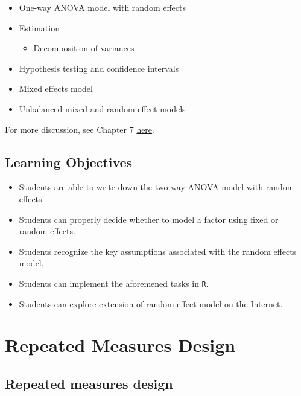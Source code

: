 \documentclass[12pt,]{book}
\providecommand{\tightlist}{%
  \setlength{\itemsep}{0pt}\setlength{\parskip}{0pt}}
\begin{document}
\begin{itemize}
\tightlist
\item
  One-way ANOVA model with random effects
\item
  Estimation

  \begin{itemize}
  \tightlist
  \item
    Decomposition of variances
  \end{itemize}
\item
  Hypothesis testing and confidence intervals
\item
  Mixed effects model
\item
  Unbalanced mixed and random effect models
\end{itemize}

For more discussion, see Chapter 7
\href{https://stat.ethz.ch/~meier/teaching/anova/random-and-mixed-effects-models.html}{here}.

\section{Learning Objectives}\label{learning-objectives-3}

\begin{itemize}
\tightlist
\item
  Students are able to write down the two-way ANOVA model with random
  effects.
\item
  Students can properly decide whether to model a factor using fixed or
  random effects.
\item
  Students recognize the key assumptions associated with the random
  effects model.
\item
  Students can implement the aforemened tasks in \texttt{R}.
\item
  Students can explore extension of random effect model on the Internet.
\end{itemize}

\chapter{Repeated Measures Design}\label{ch:repeated}

\section{Repeated measures design}\label{repeated-measures-design}
\end{document}
